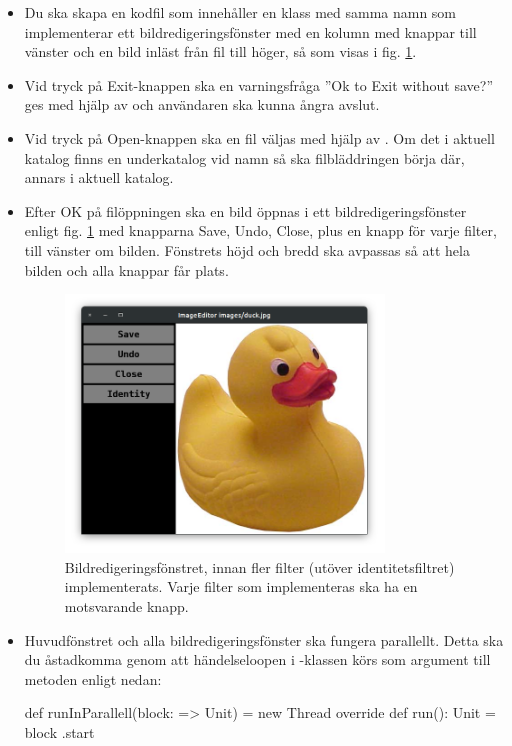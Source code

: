 \begin{itemize}
\item Du ska skapa en kodfil  som innehåller en klass med samma namn som implementerar ett bildredigeringsfönster med en kolumn med knappar till vänster och en bild inläst från fil till höger, så som visas i fig. \ref{photo:fig:editor-one-filter}. 
\item Vid tryck på Exit-knappen ska en varningsfråga ''Ok to Exit without save?'' ges med hjälp av  och användaren ska kunna ångra avslut.
\item Vid tryck på Open-knappen ska en fil väljas med hjälp av . Om det i aktuell katalog finns en underkatalog vid namn  så ska filbläddringen börja där, annars i aktuell katalog. 
\item Efter OK på filöppningen ska en bild öppnas i ett bildredigeringsfönster enligt fig. \ref{photo:fig:editor-one-filter} med knapparna Save, Undo, Close, plus en knapp för varje filter, till vänster om bilden. Fönstrets höjd och bredd ska avpassas så att hela bilden och alla knappar får plats.

\begin{figure}
\centering
\includegraphics[width=0.8\textwidth]{../img/w12-assignment-photo/photo-duck.png}
\caption{Bildredigeringsfönstret, innan fler filter (utöver identitetsfiltret) implementerats. Varje filter som implementeras ska ha en motsvarande knapp.}
\label{photo:fig:editor-one-filter}
\end{figure}

\item Huvudfönstret och alla bildredigeringsfönster ska fungera parallellt. Detta ska du åstadkomma genom att händelseloopen i -klassen körs som argument till metoden  enligt nedan: 
\begin{CodeSmall}
  def runInParallell(block: => Unit) = 
    new Thread{ override def run(): Unit = block }.start


\end{CodeSmall}
\end{itemize}
